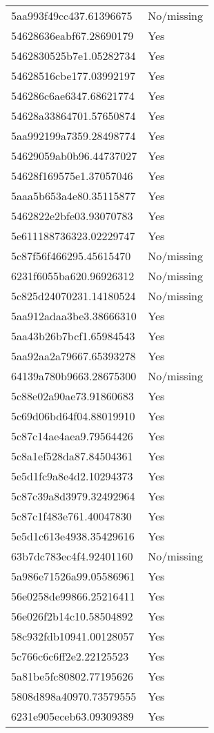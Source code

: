 \begin{tabular}{ll}
5aa993f49cc437.61396675 & No/missing \\
54628636eabf67.28690179 & Yes \\
5462830525b7e1.05282734 & Yes \\
54628516cbe177.03992197 & Yes \\
546286c6ae6347.68621774 & Yes \\
54628a33864701.57650874 & Yes \\
5aa992199a7359.28498774 & Yes \\
54629059ab0b96.44737027 & Yes \\
54628f169575e1.37057046 & Yes \\
5aaa5b653a4e80.35115877 & Yes \\
5462822e2bfe03.93070783 & Yes \\
5e611188736323.02229747 & Yes \\
5c87f56f466295.45615470 & No/missing \\
6231f6055ba620.96926312 & No/missing \\
5c825d24070231.14180524 & No/missing \\
5aa912adaa3be3.38666310 & Yes \\
5aa43b26b7bcf1.65984543 & Yes \\
5aa92aa2a79667.65393278 & Yes \\
64139a780b9663.28675300 & No/missing \\
5c88e02a90ae73.91860683 & Yes \\
5c69d06bd64f04.88019910 & Yes \\
5c87c14ae4aea9.79564426 & Yes \\
5c8a1ef528da87.84504361 & Yes \\
5e5d1fc9a8e4d2.10294373 & Yes \\
5c87c39a8d3979.32492964 & Yes \\
5c87c1f483e761.40047830 & Yes \\
5e5d1c613e4938.35429616 & Yes \\
63b7dc783ec4f4.92401160 & No/missing \\
5a986e71526a99.05586961 & Yes \\
56e0258de99866.25216411 & Yes \\
56e026f2b14c10.58504892 & Yes \\
58c932fdb10941.00128057 & Yes \\
5c766c6c6ff2e2.22125523 & Yes \\
5a81be5fc80802.77195626 & Yes \\
5808d898a40970.73579555 & Yes \\
6231e905eceb63.09309389 & Yes \\

\end{tabular}
